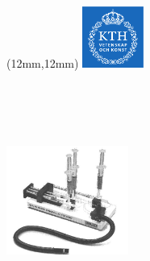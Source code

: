 

\makeatletter
    \begin{titlepage}
\begin{textblock*}{2cm}(12mm,12mm) %
\includegraphics[width=2cm]{fig/kth.pdf}
\end{textblock*}
      \begin{center}
        ~\\[20ex]
            {\LARGE \bfseries \sffamily \@title }\\[4ex]
            {\Large  \@author}\\[4ex]
            \@date \\[14ex]
            \includegraphics[width=4cm]{fig/setup_bw3.jpg}
        \end{center}
    \end{titlepage}
\makeatother
\thispagestyle{empty}
\newpage

\thispagestyle{empty}
\newpage

\setcounter{page}{1} %
